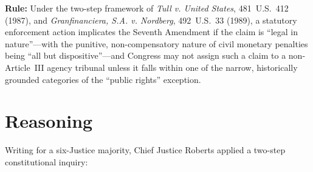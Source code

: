 \documentclass[12pt]{article}
\begin{document}
\textbf{Rule:} Under the two-step framework of \textit{Tull v. United States}, 481~U.S.~412 (1987), and \textit{Granfinanciera, S.A. v. Nordberg}, 492~U.S.~33 (1989), a statutory enforcement action implicates the Seventh Amendment if the claim is ``legal in nature''---with the punitive, non-compensatory nature of civil monetary penalties being ``all but dispositive''---and Congress may not assign such a claim to a non-Article~III agency tribunal unless it falls within one of the narrow, historically grounded categories of the ``public rights'' exception.

\section{Reasoning}
Writing for a six-Justice majority, Chief Justice Roberts applied a two-step constitutional inquiry:
\end{document}
